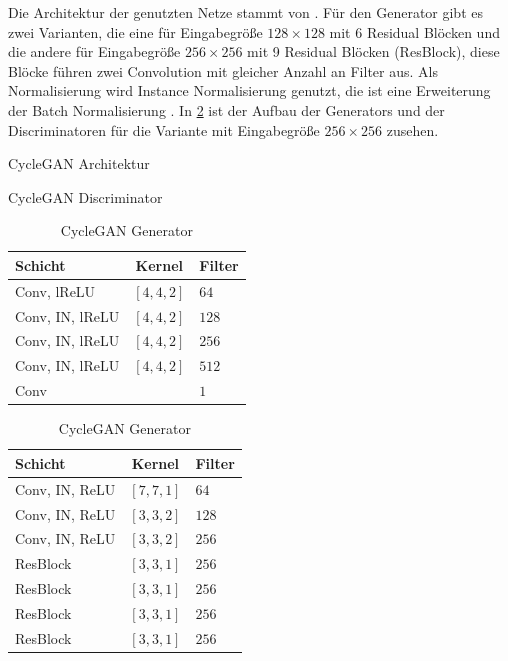  Die Architektur der genutzten Netze stammt von \citeauthor{johnson2016perceptual} \cite{johnson2016perceptual}. Für den Generator gibt es zwei Varianten, die eine für Eingabegröße $128 \times 128$ mit 6 Residual Blöcken und die andere für Eingabegröße $256 \times 256$ mit 9 Residual Blöcken (ResBlock), diese Blöcke führen zwei Convolution mit gleicher Anzahl an Filter aus. Als Normalisierung wird Instance Normalisierung genutzt, die ist eine Erweiterung der Batch Normalisierung \cite{ulyanov_instance_2016}. In \cref{tab:cycleGAN} ist der Aufbau der Generators und der Discriminatoren für die Variante mit Eingabegröße $256 \times 256$ zusehen.
 
 \begin{table}[]
 	\caption{CycleGAN Architektur}
 	\label{tab:cycleGAN}
 	\begin{center}
 		\begin{minipage}{.5\linewidth}
 			\caption{CycleGAN Discriminator}
 			\centering
 			\begin{tabular}{lcl}
 				\toprule
 				Schicht & Kernel & Filter\\
 				\toprule
 				Conv, lReLU & $[4,4,2]$ & $64$\\
 				\midrule
 				Conv, IN, lReLU & $[4,4,2]$ & $128$\\
 				\midrule
 				Conv, IN, lReLU & $[4,4,2]$ & $256$\\
 				\midrule
 				Conv, IN, lReLU & $[4,4,2]$ & $512$\\
 				\midrule
 				Conv & &$1$\\
 				\bottomrule
 			\end{tabular}
 		\end{minipage}%
 		\begin{minipage}{.5\linewidth}
 			\centering
 			\caption{CycleGAN Generator}
 			\begin{tabular}{lcl}
 				\toprule
 				Schicht & Kernel & Filter\\
 				\toprule
 				Conv, IN, ReLU & $[7,7,1]$ & $64$\\
 				\midrule
 				Conv, IN, ReLU & $[3,3,2]$ & $128$\\
 				\midrule
 				Conv, IN, ReLU & $[3,3,2]$ & $256$\\
 				\midrule
 				ResBlock & $[3,3,1]$& $256$ \\
 				\midrule
 				ResBlock & $[3,3,1]$& $256$ \\
 				\midrule
 				ResBlock & $[3,3,1]$& $256$ \\
 				\midrule
 				ResBlock & $[3,3,1]$& $256$ \\

\end{tabular}
\end{minipage}
\end{center}
\end{table}
